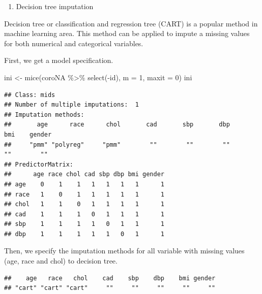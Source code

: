 \documentclass[
  10pt,
]{krantz}
\newenvironment{Shaded}{\begin{snugshade}}{\end{snugshade}}
\newcommand{\AttributeTok}[1]{\textcolor[rgb]{0.77,0.63,0.00}{#1}}
\newcommand{\DecValTok}[1]{\textcolor[rgb]{0.00,0.00,0.81}{#1}}
\newcommand{\FunctionTok}[1]{\textcolor[rgb]{0.00,0.00,0.00}{#1}}
\newcommand{\NormalTok}[1]{#1}
\newcommand{\OtherTok}[1]{\textcolor[rgb]{0.56,0.35,0.01}{#1}}
\newcommand{\SpecialCharTok}[1]{\textcolor[rgb]{0.00,0.00,0.00}{#1}}
\newcommand{\StringTok}[1]{\textcolor[rgb]{0.31,0.60,0.02}{#1}}
\providecommand{\tightlist}{%
  \setlength{\itemsep}{0pt}\setlength{\parskip}{0pt}}
\begin{document}
\begin{enumerate}
\def\labelenumi{\arabic{enumi}.}
\setcounter{enumi}{2}
\tightlist
\item
  Decision tree imputation
\end{enumerate}

Decision tree or classification and regression tree (CART) is a popular method in machine learning area. This method can be applied to impute a missing values for both numerical and categorical variables.

First, we get a model specification.

\begin{Shaded}
\begin{Highlighting}[]
\NormalTok{ini }\OtherTok{\textless{}{-}} \FunctionTok{mice}\NormalTok{(coroNA }\SpecialCharTok{\%\textgreater{}\%} \FunctionTok{select}\NormalTok{(}\SpecialCharTok{{-}}\NormalTok{id), }\AttributeTok{m =} \DecValTok{1}\NormalTok{, }\AttributeTok{maxit =} \DecValTok{0}\NormalTok{) }
\NormalTok{ini}
\end{Highlighting}
\end{Shaded}

\begin{verbatim}
## Class: mids
## Number of multiple imputations:  1 
## Imputation methods:
##       age      race      chol       cad       sbp       dbp       bmi    gender 
##     "pmm" "polyreg"     "pmm"        ""        ""        ""        ""        "" 
## PredictorMatrix:
##      age race chol cad sbp dbp bmi gender
## age    0    1    1   1   1   1   1      1
## race   1    0    1   1   1   1   1      1
## chol   1    1    0   1   1   1   1      1
## cad    1    1    1   0   1   1   1      1
## sbp    1    1    1   1   0   1   1      1
## dbp    1    1    1   1   1   0   1      1
\end{verbatim}

Then, we specify the imputation methods for all variable with missing values (age, race and chol) to decision tree.

\begin{Shaded}
\end{Shaded}

\begin{verbatim}
##    age   race   chol    cad    sbp    dbp    bmi gender 
## "cart" "cart" "cart"     ""     ""     ""     ""     ""
\end{verbatim}
\end{document}
